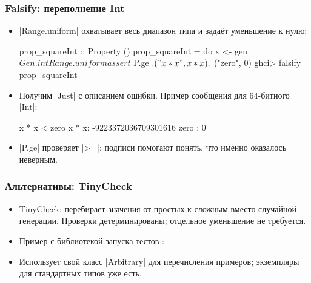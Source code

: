 \documentclass[11pt]{beamer}
\begin{document}
\begin{frame}[fragile]
  \frametitle{Falsify: переполнение Int}
  \begin{itemize}
    \item \haskinline|Range.uniform| охватывает весь диапазон типа и задаёт уменьшение к нулю:
          \begin{haskellsmall}
            prop_squareInt :: Property ()
            prop_squareInt = do
              x <- gen $ Gen.int Range.uniform
              assert $ P.ge .$ ("x * x", x * x)
                            .$ ("zero", 0)
            ghci> falsify prop_squareInt
          \end{haskellsmall}
          \pause
    \item Получим \haskinline|Just| с описанием ошибки. Пример сообщения для 64-битного \haskinline|Int|:
          \begin{ghcismall}
            x * x < zero
            x * x: -9223372036709301616
            zero : 0
          \end{ghcismall}
    \item \haskinline|P.ge| проверяет \haskinline|>=|; подписи помогают понять, что именно оказалось неверным.
  \end{itemize}
\end{frame}

\begin{frame}[fragile]
  \frametitle{Альтернативы: TinyCheck}
  \begin{itemize}
    \item \href{https://github.com/turion/tinycheck}{TinyCheck}: перебирает значения от простых к сложным вместо случайной генерации. Проверки детерминированы; отдельное уменьшение не требуется.
    \item Пример с библиотекой запуска тестов :
    \item Использует свой класс \haskinline|Arbitrary| для перечисления примеров; экземпляры для стандартных типов уже есть.
  \end{itemize}
\end{frame}
\end{document}
